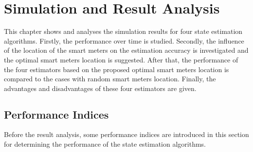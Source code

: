 \chapter{Simulation and Result Analysis}
\label{chap:Simulation_And_Result_Analysis}
This chapter shows and analyses the simulation results for four state estimation algorithms. Firstly, the performance over time is studied. Secondly, the influence of the location of the smart meters on the estimation accuracy is investigated and the optimal smart meters location is suggested. After that, the performance of the four estimators based on the proposed optimal smart meters location is compared to the cases with random smart meters location. Finally, the advantages and disadvantages of these four estimators are given.
\section{Performance Indices}
Before the result analysis, some performance indices are introduced in this section for determining the performance of the state estimation algorithms. 
